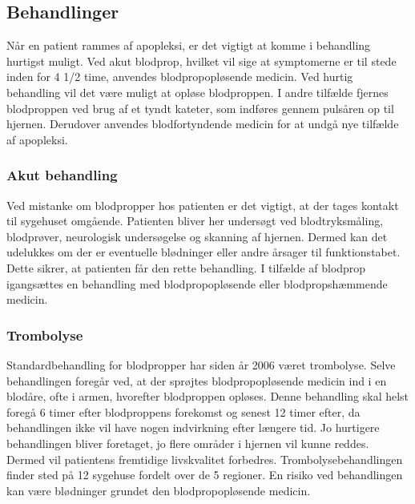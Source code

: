 \subsection{Behandlinger}
Når en patient rammes af apopleksi, er det vigtigt at komme i behandling hurtigst muligt. Ved akut blodprop, hvilket vil sige at symptomerne er til stede inden for 4 1/2 time, anvendes blodpropopløsende medicin. Ved hurtig behandling vil det være muligt at opløse blodproppen. I andre tilfælde fjernes blodproppen ved brug af et tyndt kateter, som indføres gennem pulsåren op til hjernen. Derudover anvendes blodfortyndende medicin for at undgå nye tilfælde af apopleksi. \cite{Hjerteforeningen2014} \cite{Kruuse2014a}

\subsubsection{Akut behandling}
Ved mistanke om blodpropper hos patienten er det vigtigt, at der tages kontakt til sygehuset omgående. Patienten bliver her undersøgt ved blodtryksmåling, blodprøver, neurologisk undersøgelse og skanning af hjernen. Dermed kan det udelukkes om der er eventuelle blødninger eller andre årsager til funktionstabet. Dette  sikrer, at patienten får den rette behandling. I tilfælde af blodprop igangsættes en behandling med blodpropopløsende eller blodpropshæmmende medicin. \cite{Hjerteforeningen2014} \cite{Kruuse2014a} 

\subsubsection{Trombolyse}
Standardbehandling for blodpropper har siden år 2006 været trombolyse. Selve behandlingen foregår ved, at der sprøjtes blodpropopløsende medicin ind i en blodåre, ofte i armen, hvorefter blodproppen opløses. Denne behandling skal helst foregå 6 timer efter blodproppens forekomst og senest 12 timer efter, da behandlingen ikke vil have nogen indvirkning efter længere tid. Jo hurtigere behandlingen bliver foretaget, jo flere områder i hjernen vil kunne reddes. Dermed vil patientens fremtidige livskvalitet forbedres. Trombolysebehandlingen finder sted på 12 sygehuse fordelt over de 5 regioner. En risiko ved behandlingen kan være blødninger grundet den blodpropopløsende medicin.\cite{Hjernesagen2015b} 


